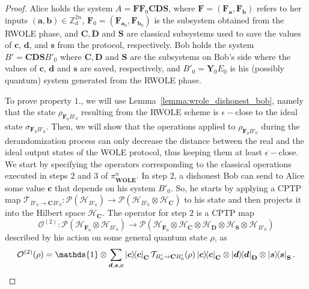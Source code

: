 \begin{proof}
Alice holds the system $A = \mathbf{F} \mathbf{F}_0 \mathbf{C} \mathbf{D} \mathbf{S}$, where $\mathbf{F} = (\mathbf{F}_{\bm{a}}, \mathbf{F}_{\bm{b}})$ refers to her inputs $(\bm{a}, \bm{b})\in \mathbb{Z}^{2n}_d$, $\mathbf{F}_0 = (\mathbf{F}_{\bm{a}_0}, \mathbf{F}_{\bm{b}_0})$ is the subsystem obtained from the RWOLE phase, and $\mathbf{C}, \mathbf{D}$ and $\mathbf{S}$ are classical subsystems used to save the values of  $\bm{c}$, $\bm{d}$, and $\bm{s}$ from the protocol, respectively.  Bob holds the system $B' = \mathbf{C} \mathbf{D} \mathbf{S} B'_0$ where $\mathbf{C}, \mathbf{D}$ and $\mathbf{S}$ are the subsystems on Bob's side where the values of $\bm{c}$, $\bm{d}$ and $\bm{s}$ are saved, respectively, and $B'_0 = \mathbf{Y}_0 E_0$ is his (possibly quantum) system generated from the RWOLE phase.

To prove property $1.$, we will use Lemma~\ref{lemma:wrole_dishonest_bob}, namely that the state $\rho_{\mathbf{F}_0 B'_0}$  resulting from the RWOLE scheme is $\epsilon-$close to the ideal state $\sigma_{\mathbf{F}_0 B'_0}$. Then, we will show that the operations applied to $\rho_{\mathbf{F}_0 B'_0}$ during the derandomization process can only decrease the distance between the real and the ideal output states of the WOLE protocol, thus keeping them at least $\epsilon-$close.
We start by specifying the operators corresponding to the classical operations executed in steps $2$ and $3$ of $\mathcal{\pi}^n_{\textbf{WOLE}}$. In step 2, a dishonest Bob can send to Alice some value $\bm{c}$ that depends on his system $B'_0$. So, he starts by applying a CPTP map $\mathcal{T}_{B'_0 \rightarrow \mathbf{C} B'_0}: \mathcal{P}\left( \mathcal{H}_{B'_0}\right) \rightarrow \mathcal{P}\left( \mathcal{H}_{B'_0}\otimes \mathcal{H}_{\mathbf{C}} \right)$ to his state and then projects it into the Hilbert space $\mathcal{H}_{\mathbf{C}}$. The operator for step $2$ is a CPTP map 
$$\mathcal{O}^{(2)} :  \mathcal{P}\left(\mathcal{H}_{\mathbf{F}_0} \otimes \mathcal{H}_{B'_0}\right) \rightarrow \mathcal{P}\left(\mathcal{H}_{\mathbf{F}_0} \otimes \mathcal{H}_{\mathbf{C}} \otimes \mathcal{H}_{\mathbf{D}} \otimes \mathcal{H}_{\mathbf{S}} \otimes \mathcal{H}_{B'_0}\right)$$
described by his action on some general quantum state $\rho$, as
\begin{equation*}
    \mathcal{O}^{(2)}(\rho) = \mathds{1} \otimes \sum_{\bm{d}, \bm{s}, \bm{c}} \ketbra{\bm{c}}_{\mathbf{C}} \mathcal{T}_{B'_0 \rightarrow \mathbf{C} B'_0}(\rho) \ketbra{\bm{c}}_{\mathbf{C}} \otimes \ketbra{\bm{d}}_{\mathbf{D}}\otimes\ketbra{\bm{s}}_{\mathbf{S}} .
\end{equation*}


\end{proof}
